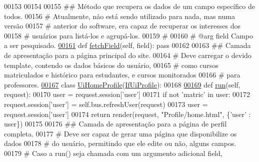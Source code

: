 \begin{DoxyCode}
00153 
00154 
00155     \textcolor{comment}{## Método que recupera os dados de um campo específico de todos.}
00156     \textcolor{comment}{#       Atualmente, não está sendo utilizado para nada, mas numa versão}
00157     \textcolor{comment}{#       anterior do software, era capaz de recuperar os interesses dos}
00158     \textcolor{comment}{#       usuários para listá-los e agrupá-los.}
00159     \textcolor{comment}{#}
00160     \textcolor{comment}{#   @arg    field       Campo a ser pesquisado.}
\hypertarget{ProfileUnit_8py_source_l00161}{}\hyperlink{classProfile_1_1ProfileUnit_1_1IfPersProfile_aafcfa1f16047754f81a1622499ea5ba0}{00161}     \textcolor{keyword}{def }\hyperlink{classProfile_1_1ProfileUnit_1_1IfPersProfile_aafcfa1f16047754f81a1622499ea5ba0}{fetchField}(self, field): \textcolor{keyword}{pass}
00162 
00163 \textcolor{comment}{## Camada de apresentação para a página principal do site.}
00164 \textcolor{comment}{#   Deve carregar o devido template, contendo os dados básicos do usuário,}
00165 \textcolor{comment}{#   como cursos matriculados e histórico para estudantes, e cursos monitorados}
00166 \textcolor{comment}{#   para professores.}
\hypertarget{ProfileUnit_8py_source_l00167}{}\hyperlink{classProfile_1_1ProfileUnit_1_1UiHomeProfile}{00167} \textcolor{keyword}{class }\hyperlink{classProfile_1_1ProfileUnit_1_1UiHomeProfile}{UiHomeProfile}(\hyperlink{classProfile_1_1ProfileUnit_1_1IfUiProfile}{IfUiProfile}): 
00168 
\hypertarget{ProfileUnit_8py_source_l00169}{}\hyperlink{classProfile_1_1ProfileUnit_1_1UiHomeProfile_ac3f4ee661e0cb6fbc3c58285ce5f57d6}{00169}     \textcolor{keyword}{def }\hyperlink{classProfile_1_1ProfileUnit_1_1UiHomeProfile_ac3f4ee661e0cb6fbc3c58285ce5f57d6}{run}(self, request):
00170         user = request.session[\textcolor{stringliteral}{'user'}]
00171         \textcolor{keywordflow}{if} \textcolor{keywordflow}{not} \textcolor{stringliteral}{'matric'} \textcolor{keywordflow}{in} user:
00172             request.session[\textcolor{stringliteral}{'user'}] = self.bus.refreshUser(request)
00173             user = request.session[\textcolor{stringliteral}{'user'}]
00174         \textcolor{keywordflow}{return} render(request, \textcolor{stringliteral}{"Profile/home.html"}, \{\textcolor{stringliteral}{'user'} : user\})
00175 
00176 \textcolor{comment}{## Camada de apresentação para a página de perfil completa.}
00177 \textcolor{comment}{#   Deve ser capaz de gerar uma página que disponibilize os dados}
00178 \textcolor{comment}{#   do usuário, permitindo que ele edite ou não, alguns campos.}
00179 \textcolor{comment}{#   Caso a run() seja chamada com um argumento adicional field,}

\end{DoxyCode}
